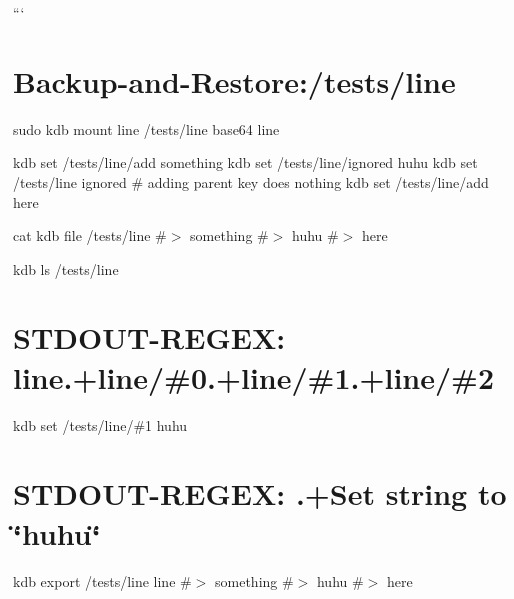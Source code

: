``` \hypertarget{autotoc_md341_autotoc_md344}{}\section{Backup-\/and-\/\+Restore\+:/tests/line}\label{autotoc_md341_autotoc_md344}
sudo kdb mount line /tests/line base64 line

kdb set /tests/line/add something kdb set /tests/line/ignored huhu kdb set /tests/line ignored \# adding parent key does nothing kdb set /tests/line/add here

cat {\ttfamily kdb file /tests/line} \#$>$ something \#$>$ huhu \#$>$ here

kdb ls /tests/line \hypertarget{autotoc_md341_autotoc_md345}{}\section{S\+T\+D\+O\+U\+T-\/\+R\+E\+G\+E\+X\+: line.+line/\#0.+line/\#1.+line/\#2}\label{autotoc_md341_autotoc_md345}
kdb set /tests/line/\#1 huhu \hypertarget{autotoc_md341_autotoc_md346}{}\section{S\+T\+D\+O\+U\+T-\/\+R\+E\+G\+E\+X\+: .+\+Set string to \char`\"{}huhu\char`\"{}}\label{autotoc_md341_autotoc_md346}
kdb export /tests/line line \#$>$ something \#$>$ huhu \#$>$ here

